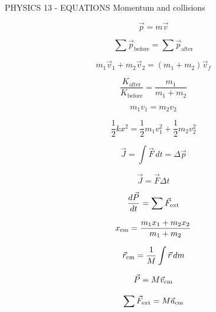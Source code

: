 PHYSICS 13 - EQUATIONS
Momentum and collisions

$$\vec p = m\vec v$$

$$\sum\vec p_{\text{before}} = \sum\vec p_{\text{after}}$$

$$m_1\vec v_1 + m_2\vec v_2 = (m_1 + m_2)\vec v_f$$

$$\frac{K_{\text{after}}}{K_{\text{before}}} = \frac{m_1}{m_1 + m_2}$$

$$m_1v_1 = m_2v_2$$

$$\frac12 kx^2 = \frac12 m_1v_1^2 + \frac12 m_2v_2^2$$


$$\vec J=\int\vec F\,dt=\Delta\vec p$$

$$\vec J=\vec F\Delta t$$

$$\frac{d\vec P}{dt}=\sum\vec F_{\rm ext}$$

$$x_{\rm cm}=\frac{m_1x_1+m_2x_2}{m_1+m_2}$$

$$\vec r_{\rm cm}=\frac1M\int\vec r\,dm$$

$$\vec P=M\vec v_{\rm cm}$$

$$\sum\vec F_{\rm ext}=M\vec a_{\rm cm}$$
